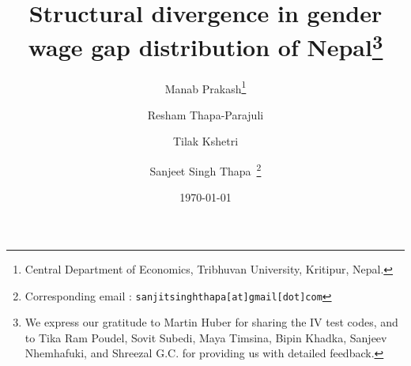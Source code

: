 \begin{titlepage}
\title{\vspace{-2.0cm}Structural divergence in gender wage gap distribution of Nepal\footnote{We express our gratitude to Martin Huber for sharing the IV test codes, and to Tika Ram Poudel, Sovit Subedi, Maya Timsina, Bipin Khadka, Sanjeev Nhemhafuki, and Shreezal G.C. for providing us with detailed feedback.}
}
\author{Manab Prakash\thanks{Central Department of Economics, Tribhuvan University, Kritipur, Nepal.} \and   Resham  Thapa-Parajuli\footnotemark[2]
\and Tilak Kshetri\footnotemark[2]  \and Sanjeet Singh Thapa\footnotemark[2]~\thanks{Corresponding email : \texttt{sanjitsinghthapa[at]gmail[dot]com}}}
\date{\today}
\maketitle

\thispagestyle{empty}
\end{titlepage}
\pagebreak 
